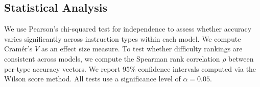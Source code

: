 \subsection{Statistical Analysis}
\label{sec:stats}

We use Pearson's chi-squared test for independence to assess whether accuracy varies significantly across instruction types within each model. We compute Cram\'{e}r's $V$ as an effect size measure. To test whether difficulty rankings are consistent across models, we compute the Spearman rank correlation $\rho$ between per-type accuracy vectors. We report 95\% confidence intervals computed via the Wilson score method. All tests use a significance level of $\alpha = 0.05$.
